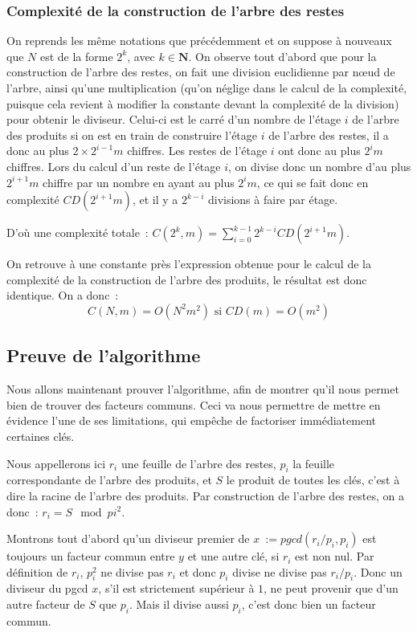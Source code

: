 \documentclass[a4paper,10pt]{article}
\begin{document}
  \subsubsection{Complexité de la construction de l'arbre des restes\label{sn:complexite_arb_rst}}
  On reprends les même notations que précédemment et on suppose à nouveaux que $N$ est de la forme $2^k$, avec $k\in\mathbf{N}$.
  On observe tout d'abord que pour la construction de l'arbre des restes, on fait une division euclidienne par nœud de l'arbre, ainsi qu'une multiplication (qu'on néglige dans le calcul de la complexité, puisque cela revient à modifier la constante devant la complexité de la division) pour obtenir le diviseur. Celui-ci est le carré d'un nombre de l'étage $i$ de l'arbre des produits si on est en train de construire l'étage $i$ de l'arbre des restes, il a donc au plus $2 \times 2^{i-1}m$ chiffres. Les restes de l'étage $i$ ont donc au plus $2^i m$ chiffres.
  Lors du calcul d'un reste de l'étage $i$, on divise donc un nombre d'au plus $2^{i+1}m$ chiffre par un nombre en ayant au plus $2^i m$, ce qui se fait donc en complexité $CD(2^{i+1}m)$, et il y a $2^{k-i}$ divisions à faire par étage.
  
  D'où une complexité totale~: $C(2^k, m) = \sum_{i=0}^{k-1}2^{k-i}CD(2^{i+1}m)$.
  
  On retrouve à une constante près l'expression obtenue pour le calcul de la complexité de la construction de l'arbre des produits, le résultat est donc identique.
  On a donc~:
  \[
   C(N,m) = O(N^2m^2) \text{ si } CD(m) = O(m^2)
  \]
  
  \subsection{Preuve de l'algorithme}
  Nous allons maintenant prouver l'algorithme, afin de montrer qu'il nous permet bien de trouver des facteurs communs.
  Ceci va nous permettre de mettre en évidence l'une de ses limitations, qui empêche de factoriser immédiatement certaines clés.
  
  Nous appellerons ici $r_i$ une feuille de l'arbre des restes, $p_i$ la feuille correspondante de l'arbre des produits, et $S$ le produit de toutes les clés, c'est à dire la racine de l'arbre des produits.
  Par construction de l'arbre des restes, on a donc~: $r_i = S \mod pi^2$.
  
  Montrons tout d'abord qu'un diviseur premier de $x~:= pgcd(r_i/p_i,p_i)$ est toujours un facteur commun entre $y$ et une autre clé, si $r_i$ est non nul. Par définition de $r_i$, $p_i^2$ ne divise pas $r_i$ et donc $p_i$ divise ne divise pas $r_i/p_i$. Donc un diviseur du pgcd $x$, s'il est strictement supérieur à $1$, ne peut provenir que d'un autre facteur de $S$ que $p_i$. Mais il divise aussi $p_i$, c'est donc bien un facteur commun.
  
\end{document}
